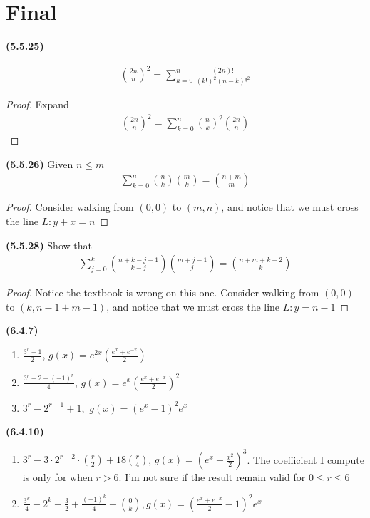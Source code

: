 \documentclass{report}
\begin{document}
\section{Final}
\begin{theorem}
\textbf{(5.5.25)}

\begin{align*}
\binom{2n}{n}^2 = \sum_{k=0}^n \frac{(2n)!}{(k!)^2 (n-k)!^2}
\end{align*}
\end{theorem}
\begin{proof}
Expand 
\begin{align*}
\binom{2n}{n}^2 = \sum_{k=0}^n \binom{n}{k}^2 \binom{2n}{n}
\end{align*}
\end{proof}
\begin{theorem}
\textbf{(5.5.26)} Given $n\leq m$
\begin{align*}
\sum_{k=0}^n \binom{n}{k}\binom{m}{k}= \binom{n+m}{m}
\end{align*}
\end{theorem}
\begin{proof}
Consider walking from $(0,0)$ to $(m,n)$, and notice that we must cross the line $L:y+x=n$
\end{proof}
\begin{theorem}
\textbf{(5.5.28)} Show that 
\begin{align*}
\sum_{j=0}^k \binom{n+k-j-1}{k-j} \binom{m+j-1}{j}=\binom{n+m+k-2}{k}
\end{align*}
\end{theorem}
\begin{proof}
Notice the textbook is wrong on this one. Consider walking from $(0,0)$ to $(k,n-1+m-1)$, and notice that we must cross the line $L:y=n-1$
\end{proof}
\begin{theorem}
\textbf{(6.4.7)}
\begin{enumerate}[label=(\alph*)]
  \item $\frac{3^r+1}{2}$, $g(x)=e^{2x}(\frac{e^x+e^{-x}}{2})$ 
  \item $\frac{3^r+2+(-1)^r}{4}$, $g(x)=e^{x}(\frac{e^x+e^{-x}}{2})^2$ 
  \item $3^r-2^{r+1}+1,$ $g(x)=(e^x-1)^2 e^x$
\end{enumerate}
\end{theorem}
\begin{theorem}
\textbf{(6.4.10)}
\begin{enumerate}[label=(\alph*)]
  \item $3^r-3 \cdot 2 ^{r-2}\cdot \binom{r}{2} + 18 \binom{r}{4}$, $g(x)=(e^x-\frac{x^2}{2})^3$. The coefficient I compute is only for when $r>6$.  I'm not sure if the result remain valid for $0\leq r\leq 6$
  \item $\frac{3^k}{4}-2^k+\frac{3}{2}+\frac{(-1)^k}{4}+\binom{0}{k},g(x)=(\frac{e^x+e^{-x}}{2}-1)^2 e^x$
\end{enumerate}
\end{theorem}
\end{document}
